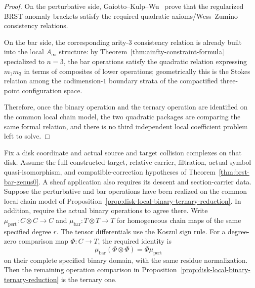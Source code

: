 \begin{proof}
On the perturbative side, Gaiotto--Kulp--Wu~\cite{GKW24} prove that the
regularized BRST-anomaly brackets satisfy the required quadratic
axioms/Wess--Zumino consistency relations.

On the bar side, the corresponding arity-$3$ consistency relation is
already built into the local $A_\infty$ structure: by
Theorem~\ref{thm:ainfty-constraint-formula} specialized to $n=3$, the
bar operations satisfy the quadratic relation expressing $m_1m_3$ in
terms of composites of lower operations; geometrically this is the
Stokes relation among the codimension-$1$ boundary strata of the
compactified three-point configuration space.

Therefore, once the binary operation and the ternary operation are
identified on the common local chain model, the two quadratic packages
are comparing the same formal relation, and there is no third
independent local coefficient problem left to solve.
\end{proof}

\begin{corollary}\label{cor:disk-local-ternary-on-brstbar-locus}
Fix a disk coordinate and actual source and target collision complexes on that disk.
Assume the full constructed-target, relative-carrier, filtration, actual symbol quasi-isomorphism, and compatible-correction hypotheses of Theorem~\ref{thm:brst-bar-genus0}.
A sheaf application also requires its descent and section-carrier data.
Suppose the perturbative and bar operations have been realized on the common local chain model of Proposition~\ref{prop:disk-local-binary-ternary-reduction}.
In addition, require the actual binary operations to agree there.
Write $\mu_{\mathrm{pert}}:C\otimes C\to C$ and $\mu_{\mathrm{bar}}:T\otimes T\to T$ for homogeneous chain maps of the same specified degree $r$.
The tensor differentials use the Koszul sign rule.
For a degree-zero comparison map $\Phi:C\to T$, the required identity is
\begin{equation}\label{eq:vir-binary-intertwining}
 \mu_{\mathrm{bar}}(\Phi\otimes\Phi)
 =\Phi\mu_{\mathrm{pert}}
\end{equation}
on their complete specified binary domain, with the same residue normalization.
Then the remaining operation comparison in Proposition~\ref{prop:disk-local-binary-ternary-reduction} is the ternary one.
\end{corollary}

